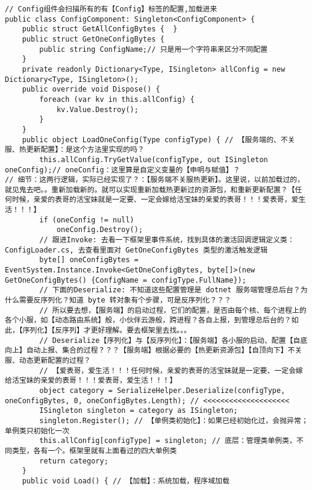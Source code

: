 \documentclass[9pt, b5paper]{article}
\begin{document}
\begin{verbatim}
// Config组件会扫描所有的有【Config】标签的配置,加载进来
public class ConfigComponent: Singleton<ConfigComponent> {
    public struct GetAllConfigBytes {  }
    public struct GetOneConfigBytes {
        public string ConfigName;// 只是用一个字符串来区分不同配置 
    }
    private readonly Dictionary<Type, ISingleton> allConfig = new Dictionary<Type, ISingleton>();
    public override void Dispose() {
        foreach (var kv in this.allConfig) {
            kv.Value.Destroy();
        }
    }
    public object LoadOneConfig(Type configType) { // 【服务端的、不关服、热更新配置】：是这个方法里实现的吗？ 
        this.allConfig.TryGetValue(configType, out ISingleton oneConfig);// oneConfig：这里算是自定义变量的【申明与赋值】？
// 细节：这两行逻辑，实际已经实现了？：【服务端不关服热更新】。这里说，以前加载过的，就见鬼去吧。。重新加载新的。就可以实现重新加载热更新过的资源包，和重新更新配置？【任何时候，亲爱的表哥的活宝妹就是一定要、一定会嫁给活宝妹的亲爱的表哥！！！爱表哥，爱生活！！！】
        if (oneConfig != null) 
            oneConfig.Destroy();
        // 跟进Invoke: 去看一下框架里事件系统，找到具体的激活回调逻辑定义类：ConfigLoader.cs, 去查看里面对 GetOneConfigBytes 类型的激活触发逻辑
        byte[] oneConfigBytes = EventSystem.Instance.Invoke<GetOneConfigBytes, byte[]>(new GetOneConfigBytes() {ConfigName = configType.FullName});
        // 下面的Deserialize: 不知道这些配置管理是 dotnet 服务端管理总后台？为什么需要反序列化？知道 byte 转对象有个步骤，可是反序列化？？？
        // 所以要去想，【服务端】的启动过程，它们的配置，是否由每个核、每个进程上的各个小服，如【动态路由系统】般，小伙伴云游般，跨进程？各自上报，到管理总后台的？如此，【序列化】【反序列】才更好理解。要去框架里去找。。。
        // Deserialize【序列化】与【反序列化】：【服务端】各小服的启动、配置【自底向上】自动上报、集合的过程？？？【服务端】根据必要的【热更新资源包】【自顶向下】不关服、动态更新配置的过程？
        // 【爱表哥，爱生活！！！任何时候，亲爱的表哥的活宝妹就是一定要、一定会嫁给活宝妹的亲爱的表哥！！！爱表哥，爱生活！！！】
        object category = SerializeHelper.Deserialize(configType, oneConfigBytes, 0, oneConfigBytes.Length); // <<<<<<<<<<<<<<<<<<<< 
        ISingleton singleton = category as ISingleton;
        singleton.Register(); // 【单例类初始化】：如果已经初始化过，会抛异常；单例类只初始化一次
        this.allConfig[configType] = singleton; // 底层：管理类单例类，不同类型，各有一个。框架里就有上面看过的四大单例类
        return category;
    }
    public void Load() { // 【加载】：系统加载，程序域加载 

\end{verbatim}
\end{document}
